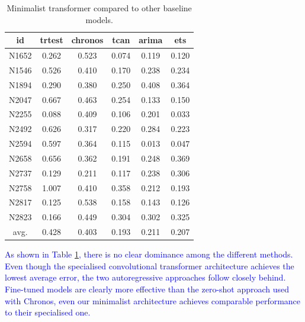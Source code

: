 \documentclass[algorithms,article,submit,pdftex,moreauthors]{Definitions/mdpi}
\begin{document}
\begin{table}[H]
	\caption{Minimalist transformer compared to other baseline models.}
	\label{tab:comparisons}
	\centering
	\begin{tabular}{c|ccccc}
		\toprule
		id   & trtest & chronos & tcan & arima & ets \\
		\midrule
		N1652 & 0.262 & 0.523 & 0.074 & 0.119 & 0.120 \\
		N1546 & 0.526 & 0.410 & 0.170 & 0.238 & 0.234 \\
		N1894 & 0.290 & 0.380 & 0.250 & 0.408 & 0.364 \\
		N2047 & 0.667 & 0.463 & 0.254 & 0.133 & 0.150 \\
		N2255 & 0.088 & 0.409 & 0.106 & 0.201 & 0.033 \\
		N2492 & 0.626 & 0.317 & 0.220 & 0.284 & 0.223 \\
		N2594 & 0.597 & 0.364 & 0.115 & 0.013 & 0.047 \\
		N2658 & 0.656 & 0.362 & 0.191 & 0.248 & 0.369 \\
		N2737 & 0.129 & 0.211 & 0.117 & 0.238 & 0.306 \\
		N2758 & 1.007 & 0.410 & 0.358 & 0.212 & 0.193 \\
		N2817 & 0.125 & 0.538 & 0.158 & 0.143 & 0.126 \\
		N2823 & 0.166 & 0.449 & 0.304 & 0.302 & 0.325 \\
		avg.	& 0.428 & 0.403 & 0.193 & 0.211 & 0.207 \\
		\bottomrule
	\end{tabular}
\end{table}

\noindent\textcolor{blue}{As shown in Table \ref{tab:comparisons}, there is no clear dominance among the different methods. Even though the specialised convolutional transformer architecture achieves the lowest average error, the two autoregressive approaches follow closely behind. Fine-tuned models are clearly more effective than the zero-shot approach used with Chronos, even our minimalist architecture achieves comparable performance to their specialised one.}
\end{document}
